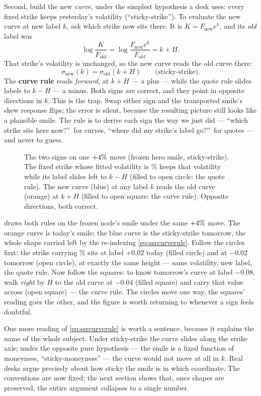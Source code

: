 Second, build the new \emph{curve}, under the simplest hypothesis a
desk uses: every fixed strike keeps yesterday's volatility
(``sticky-strike'').  To evaluate the new curve at new label $k$, ask
which strike now sits there.  It is $K=F_{\mathrm{new}}e^{k}$, and its
\emph{old} label was
\[
\log\!\frac{K}{F_{\mathrm{old}}}
=\log\!\frac{F_{\mathrm{new}}e^{k}}{F_{\mathrm{old}}}
=k+H .
\]
That strike's volatility is unchanged, so the new curve reads the old
curve there:
\begin{equation}
\sigma_{\mathrm{new}}(k)=\sigma_{\mathrm{old}}(k+H)
\qquad\text{(sticky-strike)} .
\label{eq:ssrcurverule}
\end{equation}
The \textbf{curve rule} reads \emph{forward}, at $k+H$ --- a plus ---
while the quote rule slides labels to $k-H$ --- a minus.  Both signs
are correct, and they point in opposite directions in $k$.  This is
the trap.  Swap either sign and the transported smile's skew response
flips; the error is silent, because the resulting picture still looks
like a plausible smile.  The rule is to derive each sign the way
we just did --- ``which strike sits here now?''\ for curves, ``where
did my strike's label go?''\ for quotes --- and never to guess.

\begin{figure}[htbp]
\centering
{}
\caption{The two signs on one $+4\%$ move (frozen
hero smile, sticky-strike).  The fixed strike whose fitted volatility
is \MacSsrSignQuoteVolPct\% keeps that volatility while its label
slides
left to $k-H$ (filled to open circle: the quote rule).  The new curve
(blue) at any label $k$ reads the old curve (orange) at $k+H$ (filled
to open square: the curve rule).  Opposite directions, both correct.}
\label{fig:ssrsigns}
\end{figure}

 draws both rules on the frozen node's smile under
the same $+4\%$ move.  The orange curve is today's
smile; the blue curve is the sticky-strike tomorrow, the whole shape
carried left by the re-indexing \eqref{eq:ssrcurverule}.  Follow the
circles first: the strike carrying \MacSsrSignQuoteVolPct\% sits at
label $+0.02$ today (filled circle) and at $-0.02$ tomorrow (open
circle), at exactly the same height --- same volatility, new label,
the quote rule.  Now follow the squares: to know tomorrow's curve at
label $-0.08$, walk \emph{right} by $H$ to the old curve at $-0.04$
(filled square) and carry that value across (open square) --- the
curve rule.  The circles move one way, the squares' reading goes the
other, and the figure is worth returning to whenever a sign feels
doubtful.

One more reading of \eqref{eq:ssrcurverule} is worth a sentence,
because it explains the name of the whole subject.  Under
sticky-strike the curve slides along the strike axis; under the
opposite pure hypothesis --- the smile is a fixed function of
moneyness, ``sticky-moneyness'' --- the curve would not move at all in
$k$.  Real desks argue precisely about how sticky the smile is in
which coordinate.  The conventions are now fixed; the next section
shows that, once shapes are preserved, the entire argument collapses
to a single number.

